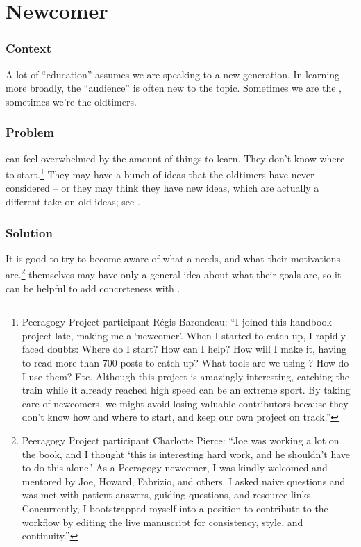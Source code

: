 \section{Newcomer}\label{sec:Newcomer}
\subsubsection*{Context}
A lot of ``education'' assumes we are speaking to a new generation. 
In learning more broadly, the ``audience'' is often new to the topic.
Sometimes we are the , sometimes we're the oldtimers.

\subsubsection*{Problem}  can feel overwhelmed by the amount of things to learn.  They
don't know where to start.\footnote{Peeragogy Project participant
R\'egis Barondeau: ``I joined this handbook project late, making me
a `newcomer'. When I started to catch up, I rapidly faced doubts:
Where do I start? How can I help? How will I make it, having to read
more than 700 posts to catch up? What tools are we using ? How do I use
them? Etc. Although this project is amazingly interesting, catching the
train while it already reached high speed can be an extreme sport. By
taking care of newcomers, we might avoid losing valuable contributors
because they don't know how and where to start, and keep our own project
on track.''}  They may have a bunch of ideas that the oldtimers have
never considered -- or they may think they have new ideas, which are actually
a different take on old ideas; see .

\subsubsection*{Solution} It is good to try to become aware of what a 
needs, and what their motivations are.\footnote{Peeragogy Project participant
Charlotte Pierce: ``Joe was working a lot on the book, and I thought
`this is interesting hard work, and he shouldn't have to do
this alone.' As a Peeragogy newcomer, I was kindly welcomed and
mentored by Joe, Howard, Fabrizio, and others. I asked naive questions
and was met with patient answers, guiding questions, and resource links.
Concurrently, I bootstrapped myself into a position to contribute to the
workflow by editing the live manuscript for consistency, style, and continuity.''}
 themselves may have only a general idea about what their goals are, so it can be
helpful to add concreteness with .

